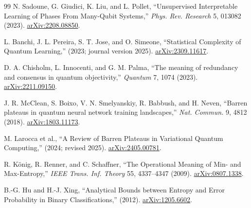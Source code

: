 \begin{thebibliography}{99}
N. Sadoune, G. Giudici, K. Liu, and L. Pollet, ``Unsupervised Interpretable Learning of Phases From Many-Qubit Systems,'' \emph{Phys. Rev. Research} 5, 013082 (2023). \href{https://arxiv.org/abs/2208.08850}{arXiv:2208.08850}.

L. Banchi, J. L. Pereira, S. T. Jose, and O. Simeone, ``Statistical Complexity of Quantum Learning,'' (2023; journal version 2025). \href{https://arxiv.org/abs/2309.11617}{arXiv:2309.11617}.

D. A. Chisholm, L. Innocenti, and G. M. Palma, ``The meaning of redundancy and consensus in quantum objectivity,'' \emph{Quantum} 7, 1074 (2023). \href{https://arxiv.org/abs/2211.09150}{arXiv:2211.09150}.

J. R. McClean, S. Boixo, V. N. Smelyanskiy, R. Babbush, and H. Neven, ``Barren plateaus in quantum neural network training landscapes,'' \emph{Nat. Commun.} 9, 4812 (2018). \href{https://arxiv.org/abs/1803.11173}{arXiv:1803.11173}.

M. Larocca et al., ``A Review of Barren Plateaus in Variational Quantum Computing,'' (2024; revised 2025). \href{https://arxiv.org/abs/2405.00781}{arXiv:2405.00781}.

R. K\"onig, R. Renner, and C. Schaffner, ``The Operational Meaning of Min- and Max-Entropy,'' \emph{IEEE Trans. Inf. Theory} 55, 4337--4347 (2009). \href{https://arxiv.org/abs/0807.1338}{arXiv:0807.1338}.

B.-G. Hu and H.-J. Xing, ``Analytical Bounds between Entropy and Error Probability in Binary Classifications,'' (2012). \href{https://arxiv.org/abs/1205.6602}{arXiv:1205.6602}.

\end{thebibliography}
